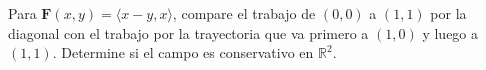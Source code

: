Para $\mathbf{F}(x,y)=\langle x-y,x\rangle$, compare el trabajo de $(0,0)$ a $(1,1)$ por la diagonal con el trabajo por la trayectoria que va primero a $(1,0)$ y luego a $(1,1)$. Determine si el campo es conservativo en $\mathbb R^2$.
